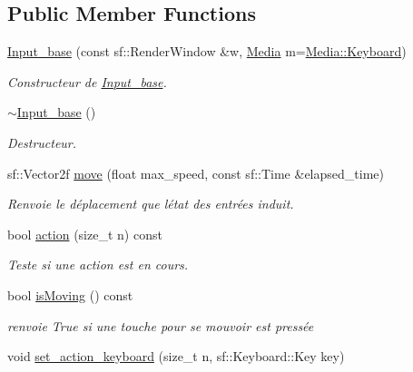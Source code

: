 \subsection*{Public Member Functions}
\begin{DoxyCompactItemize}
\item 
\mbox{\hyperlink{class_input__base_a4e1efd96da3e870a9b2f6613b99e6c00}{Input\+\_\+base}} (const sf\+::\+Render\+Window \&w, \mbox{\hyperlink{class_input__base_a455585e7933485981b3d7bfcad3a47c6}{Media}} m=\mbox{\hyperlink{class_input__base_a455585e7933485981b3d7bfcad3a47c6a6ce4d85a628a88bbdb3ac24a8e5a9c2e}{Media\+::\+Keyboard}})
\begin{DoxyCompactList}\small\item\em Constructeur de \mbox{\hyperlink{class_input__base}{Input\+\_\+base}}. \end{DoxyCompactList}\item 
\mbox{\hyperlink{class_input__base_a7dabafa58d0e4bd94a84562900d06a5e}{$\sim$\+Input\+\_\+base}} ()
\begin{DoxyCompactList}\small\item\em Destructeur. \end{DoxyCompactList}\item 
sf\+::\+Vector2f \mbox{\hyperlink{class_input__base_a61bba67b702dfd77db2091409ab1d20b}{move}} (float max\+\_\+speed, const sf\+::\+Time \&elapsed\+\_\+time)
\begin{DoxyCompactList}\small\item\em Renvoie le déplacement que l\textquotesingle{}état des entrées induit. \end{DoxyCompactList}\item 
bool \mbox{\hyperlink{class_input__base_a2ac741377832fd670954dba5abf82a10}{action}} (size\+\_\+t n) const
\begin{DoxyCompactList}\small\item\em Teste si une action est en cours. \end{DoxyCompactList}\item 
bool \mbox{\hyperlink{class_input__base_a895ecc7012d6ccdd4284de7d613f2ed2}{is\+Moving}} () const
\begin{DoxyCompactList}\small\item\em renvoie True si une touche pour se mouvoir est pressée \end{DoxyCompactList}\item 
void \mbox{\hyperlink{class_input__base_aba7163e5edb9d3f938811d990863ce0e}{set\+\_\+action\+\_\+keyboard}} (size\+\_\+t n, sf\+::\+Keyboard\+::\+Key key)

\end{DoxyCompactItemize}
